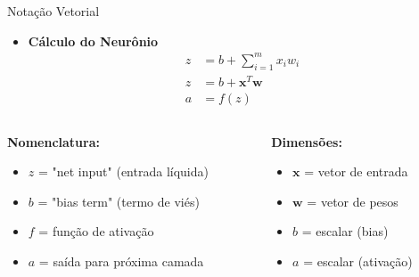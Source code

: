 \documentclass[xcolor=dvipsnames,t,aspectratio=169]{beamer}
\begin{document}
\begin{frame}[c]{Notação Vetorial}
    \begin{itemize}
        \item \bfseries Cálculo do Neurônio
        \begin{align}
            z &= b + \sum_{i=1}^{m} x_i w_i \\[0.5em]
            z &= b + \mathbf{x}^T \mathbf{w} \\[0.5em]
            a &= f(z)
        \end{align}
    \end{itemize}
    
    \vspace{0.5cm}
    
    \begin{columns}[c]
        \begin{column}{0.5\textwidth}
            \textbf{Nomenclatura:}
            \begin{itemize}
                \item $z$ = "net input" (entrada líquida)
                \item $b$ = "bias term" (termo de viés)
                \item $f$ = função de ativação
                \item $a$ = saída para próxima camada
            \end{itemize}
        \end{column}
        \begin{column}{0.5\textwidth}
            \textbf{Dimensões:}
            \begin{itemize}
                \item $\mathbf{x}$ = vetor de entrada
                \item $\mathbf{w}$ = vetor de pesos
                \item $b$ = escalar (bias)
                \item $a$ = escalar (ativação)
            \end{itemize}
        \end{column}
    \end{columns}
\end{frame}
\end{document}
